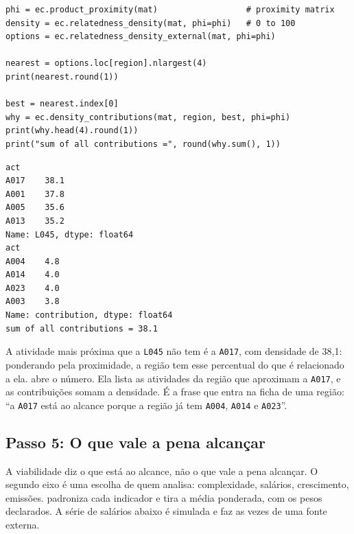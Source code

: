 \begin{lstlisting}
phi = ec.product_proximity(mat)                  # proximity matrix
density = ec.relatedness_density(mat, phi=phi)   # 0 to 100
options = ec.relatedness_density_external(mat, phi=phi)

nearest = options.loc[region].nlargest(4)
print(nearest.round(1))

best = nearest.index[0]
why = ec.density_contributions(mat, region, best, phi=phi)
print(why.head(4).round(1))
print("sum of all contributions =", round(why.sum(), 1))
\end{lstlisting}
\begin{lstlisting}[language={}, numbers=none, backgroundcolor=\color{white}, frame=leftline, framerule=2pt, rulecolor=\color{noteborder}, xleftmargin=1.5em]
act
A017    38.1
A001    37.8
A005    35.6
A013    35.2
Name: L045, dtype: float64
act
A004    4.8
A014    4.0
A023    4.0
A003    3.8
Name: contribution, dtype: float64
sum of all contributions = 38.1
\end{lstlisting}

A atividade mais próxima que a \texttt{L045} não tem é a
\texttt{A017}, com densidade de 38{,}1: ponderando
pela proximidade, a região tem esse percentual do que é relacionado a
ela.  abre o número. Ela lista as atividades
da região que aproximam a \texttt{A017}, e as contribuições somam a
densidade. É a frase que entra na ficha de uma região: ``a
\texttt{A017} está ao alcance porque a região já tem
\texttt{A004}, \texttt{A014} e
\texttt{A023}''.

\subsection{Passo 5: O que vale a pena alcançar}

A viabilidade diz o que está ao alcance, não o que vale a pena
alcançar. O segundo eixo é uma escolha de quem analisa: complexidade,
salários, crescimento, emissões.  padroniza cada
indicador e tira a média ponderada, com os pesos declarados. A série de
salários abaixo é simulada e faz as vezes de uma fonte externa.

